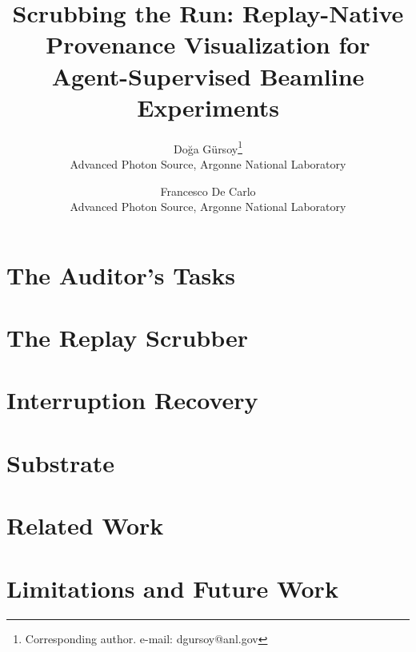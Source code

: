 \documentclass{vgtc}                 %
\title{Scrubbing the Run: Replay-Native Provenance Visualization for
Agent-Supervised Beamline Experiments}
\author{Do\u{g}a G\"ursoy\thanks{Corresponding author. e-mail: dgursoy@anl.gov}\\ %
        \scriptsize Advanced Photon Source, Argonne National Laboratory %
\and Francesco De Carlo\\ %
     \scriptsize Advanced Photon Source, Argonne National Laboratory}
\begin{document}
\label{sec:intro}
\maketitle



\section{The Auditor's Tasks}
\label{sec:tasks}


\section{The Replay Scrubber}


\section{Interruption Recovery}


\section{Substrate}


\section{Related Work}
\label{sec:related}


\section{Limitations and Future Work}
\label{sec:limitations}




\end{document}
